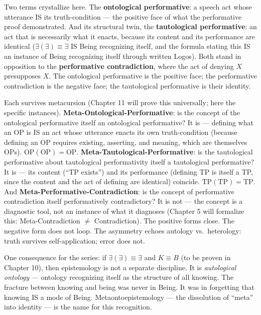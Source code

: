\documentclass[10pt, openany, oneside]{book}
\begin{document}
Two terms crystallize here. The \textbf{ontological performative}: a speech act whose utterance IS its truth-condition --- the positive face of what the performative proof demonstrated. And its structural twin, the \textbf{tautological performative}: an act that is necessarily what it enacts, because its content and its performance are identical ($\exists(\exists) \equiv \exists$ IS Being recognizing itself, and the formula stating this IS an instance of Being recognizing itself through written Logos). Both stand in opposition to the \textbf{performative contradiction}, where the act of denying $X$ presupposes $X$. The ontological performative is the positive face; the performative contradiction is the negative face; the tautological performative is their identity.

Each survives metacursion (Chapter 11 will prove this universally; here the specific instances). \textbf{Meta-Ontological-Performative}: is the concept of the ontological performative itself an ontological performative? It is --- defining what an OP is IS an act whose utterance enacts its own truth-condition (because defining an OP requires existing, asserting, and meaning, which are themselves OPs). $\text{OP}(\text{OP}) = \text{OP}$. \textbf{Meta-Tautological-Performative}: is the tautological performative about tautological performativity itself a tautological performative? It is --- its content (``TP exists'') and its performance (defining TP is itself a TP, since the content and the act of defining are identical) coincide. $\text{TP}(\text{TP}) = \text{TP}$. And \textbf{Meta-Performative-Contradiction}: is the concept of performative contradiction itself performatively contradictory? It is not --- the concept is a diagnostic tool, not an instance of what it diagnoses (Chapter 5 will formalize this: Meta-Contradiction $\neq$ Contradiction). The positive forms close. The negative form does not loop. The asymmetry echoes autology vs.\ heterology: truth survives self-application; error does not.

One consequence for the series: if $\exists(\exists) \equiv \exists$ and $K \equiv B$ (to be proven in Chapter 10), then epistemology is not a separate discipline. It is \textit{autological ontology} --- ontology recognizing itself as the structure of all knowing. The fracture between knowing and being was never in Being. It was in forgetting that knowing IS a mode of Being. Metaontoepistemology --- the dissolution of ``meta'' into identity --- is the name for this recognition.

\vspace{1.5em}
\end{document}
